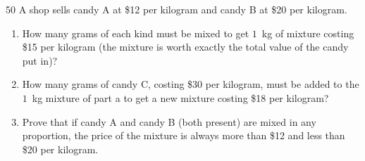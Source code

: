 \begin{probbox}{50}{}
A shop sells candy A at \$12 per kilogram and candy B at \$20 per kilogram.
\begin{enumerate}[label=\alph*),leftmargin=1.6em,itemsep=1pt]
\item How many grams of each kind must be mixed to get $1$~kg of mixture costing \$15 per kilogram (the mixture is worth exactly the total value of the candy put in)?
\item How many grams of candy C, costing \$30 per kilogram, must be added to the $1$~kg mixture of part a to get a new mixture costing \$18 per kilogram?
\item Prove that if candy A and candy B (both present) are mixed in any proportion, the price of the mixture is always more than \$12 and less than \$20 per kilogram.
\end{enumerate}
\end{probbox}
